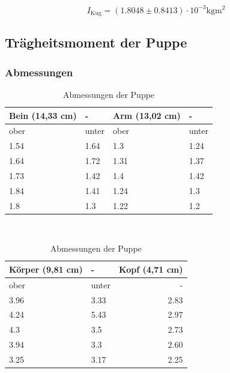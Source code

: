 \begin{equation*}
  I_{\text{Kug}} = (1.8048 \pm 0.8413) \cdot 10^{-3} \unit{\kilo\gram\meter\squared}
\end{equation*}



\subsection{Trägheitsmoment der Puppe}

\subsubsection{Abmessungen}

\begin{table}
  \centering
  \caption{Abmessungen der Puppe}
  \label{tab:Abmessungen}
  \begin{tabular}{llll}
    \toprule
    Bein (14,33 cm) & - & Arm (13,02 cm) & - \\
    \midrule
               ober &      unter &           ober &      unter \\
               1.54 &       1.64 &            1.3 &       1.24 \\
               1.64 &       1.72 &           1.31 &       1.37 \\
               1.73 &       1.42 &            1.4 &       1.42 \\
               1.84 &       1.41 &           1.24 &        1.3 \\
                1.8 &        1.3 &           1.22 &        1.2 \\
    \bottomrule
    \end{tabular}\\

    \begin{tabular}{llr}
      \toprule
      Körper (9,81 cm) & - &  Kopf (4,71 cm) \\
      \midrule
                  ober &      unter &             - \\
                  3.96 &       3.33 &            2.83 \\
                  4.24 &       5.43 &            2.97 \\
                   4.3 &        3.5 &            2.73 \\
                  3.94 &        3.3 &            2.60 \\
                  3.25 &       3.17 &            2.25 \\
      \bottomrule
      \end{tabular}
\end{table}

